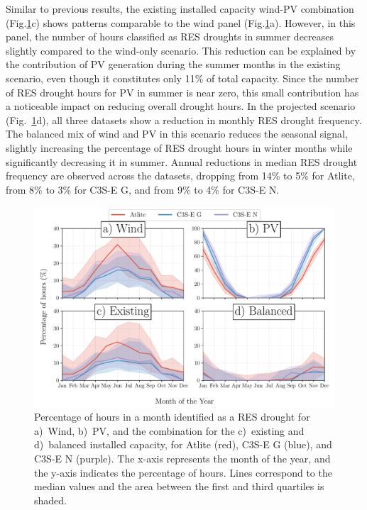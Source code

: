 \documentclass[a4paper, 11pt]{article}
\begin{document}
Similar to previous results, the existing installed capacity wind-PV combination (Fig.\ref{fig:res_droughts_seasonality}c) shows patterns comparable to the wind panel (Fig.\ref{fig:res_droughts_seasonality}a). However, in this panel, the number of hours classified as RES droughts in summer decreases slightly compared to the wind-only scenario. This reduction can be explained by the contribution of PV generation during the summer months in the existing scenario, even though it constitutes only 11\% of total capacity. Since the number of RES drought hours for PV in summer is near zero, this small contribution has a noticeable impact on reducing overall drought hours. In the projected scenario (Fig.~\ref{fig:res_droughts_seasonality}d), all three datasets show a reduction in monthly RES drought frequency. The balanced mix of wind and PV in this scenario reduces the seasonal signal, slightly increasing the percentage of RES drought hours in winter months while significantly decreasing it in summer. Annual reductions in median RES drought frequency are observed across the datasets, dropping from 14\% to 5\% for Atlite, from 8\% to 3\% for C3S-E G, and from 9\% to 4\% for C3S-E N.
 
\begin{figure}[!ht]
	\centering
	\includegraphics[width=\textwidth]{droughts_seasonality}
	\caption{Percentage of hours in a month identified as a RES drought for a)~Wind, b)~PV, and the combination for the c)~existing and d)~balanced installed capacity, for Atlite (red), C3S-E G (blue), and C3S-E N (purple). The x-axis represents the month of the year, and the y-axis indicates the percentage of hours. Lines correspond to the median values and the area between the first and third quartiles is shaded.}
	\label{fig:res_droughts_seasonality}
\end{figure}
\end{document}

